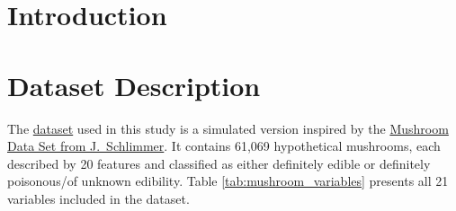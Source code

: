 \documentclass{article}
\begin{document}
\tableofcontents

\section{Introduction}

\section{Dataset Description}

The \href{https://archive.ics.uci.edu/dataset/848/secondary+mushroom+dataset}{dataset} used in this study is a simulated version inspired by the \href{https://archive.ics.uci.edu/dataset/73/mushroom}{Mushroom Data Set from J.\ Schlimmer}. It contains 61,069 hypothetical mushrooms, each described by 20 features and classified as either definitely edible or definitely poisonous/of unknown edibility. Table \ref{tab:mushroom_variables} presents all 21 variables included in the dataset.
\end{document}
